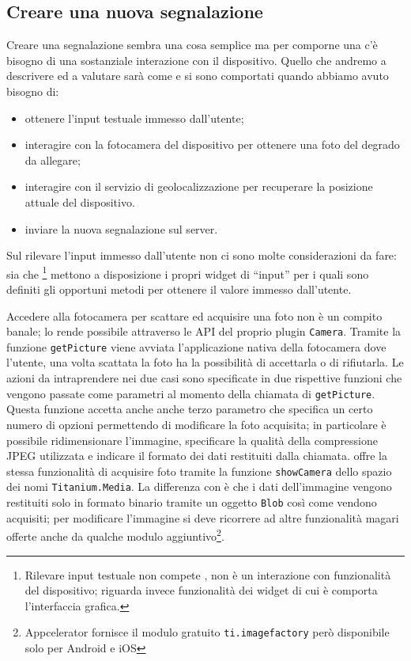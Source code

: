 			
		\subsection{Creare una nuova segnalazione}
			Creare una segnalazione sembra una cosa semplice ma per
			comporne una c'è bisogno di una sostanziale interazione con il
			dispositivo. Quello che andremo a descrivere ed a valutare sarà
			come \pg{} e \tisdk{} si sono comportati quando abbiamo avuto
			bisogno di:
			\begin{itemize}
				\item ottenere l'input testuale immesso dall'utente;
				\item interagire con la fotocamera del dispositivo per ottenere
					una foto del degrado da allegare;
				\item interagire con il servizio di geolocalizzazione per
					recuperare la posizione attuale del dispositivo.
				\item inviare la nuova segnalazione sul server.
			\end{itemize}
			
			\noindent Sul rilevare l'input immesso dall'utente non ci sono molte
			considerazioni da fare: sia \tisdk{} che
			\kendomob{}\footnote{Rilevare input testuale non compete \pg{}, non
			è un interazione con funzionalità del dispositivo; riguarda invece
			funzionalità dei widget di cui è comporta l'interfaccia grafica.}
			mettono a disposizione i propri widget di ``input'' per i quali sono
			definiti gli opportuni metodi per ottenere il valore immesso
			dall'utente.
			
			Accedere alla fotocamera per scattare ed acquisire una foto non è un 
			compito banale; \pg{} lo rende possibile attraverso le API del
			proprio plugin \texttt{Camera}. Tramite la funzione
			\texttt{getPicture} viene avviata l'applicazione nativa della
			fotocamera dove l'utente, una volta scattata la foto ha la
			possibilità di accettarla o di rifiutarla. Le azioni da
			intraprendere nei due casi sono specificate in due rispettive
			funzioni \js{} che vengono passate come parametri al momento della
			chiamata di	\texttt{getPicture}. Questa funzione accetta anche
			anche terzo parametro che specifica un certo numero di opzioni
			permettendo di modificare la foto acquisita; in particolare è
			possibile ridimensionare l'immagine, specificare la qualità della
			compressione JPEG utilizzata e indicare il formato dei dati
			restituiti dalla chiamata. \tisdk{} offre la stessa funzionalità di
			acquisire foto tramite la funzione \texttt{showCamera} dello spazio
			dei nomi \texttt{Titanium.Media}. La differenza con \pg{} è che i
			dati dell'immagine vengono restituiti solo in formato binario
			tramite un oggetto \js{} \texttt{Blob} così come vendono acquisiti;
			per modificare l'immagine si deve ricorrere ad altre funzionalità
			magari offerte anche da qualche modulo aggiuntivo\footnote{Appcelerator
			fornisce il modulo gratuito \texttt{ti.imagefactory} però
			disponibile solo per Android e iOS}.
			
